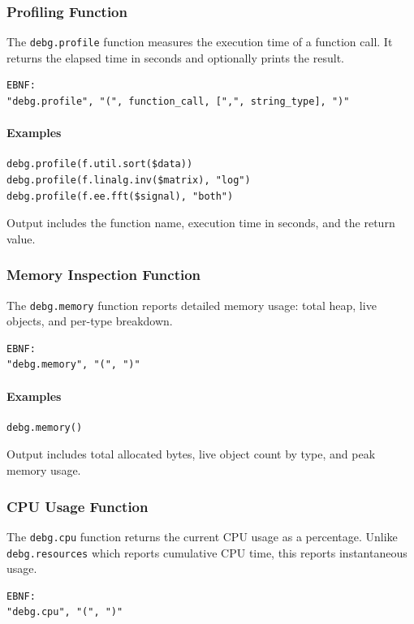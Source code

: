 \subsubsection{Profiling Function}
The \texttt{debg.profile} function measures the execution time of a function call. It returns the elapsed time in seconds and optionally prints the result.
\begin{verbatim}
EBNF:
"debg.profile", "(", function_call, [",", string_type], ")"
\end{verbatim}

\paragraph{Examples}
\begin{verbatim}
debg.profile(f.util.sort($data))
debg.profile(f.linalg.inv($matrix), "log")
debg.profile(f.ee.fft($signal), "both")
\end{verbatim}

Output includes the function name, execution time in seconds, and the return value.

\subsubsection{Memory Inspection Function}
The \texttt{debg.memory} function reports detailed memory usage: total heap, live objects, and per-type breakdown.
\begin{verbatim}
EBNF:
"debg.memory", "(", ")"
\end{verbatim}

\paragraph{Examples}
\begin{verbatim}
debg.memory()
\end{verbatim}

Output includes total allocated bytes, live object count by type, and peak memory usage.

\subsubsection{CPU Usage Function}
The \texttt{debg.cpu} function returns the current CPU usage as a percentage. Unlike \texttt{debg.resources} which reports cumulative CPU time, this reports instantaneous usage.
\begin{verbatim}
EBNF:
"debg.cpu", "(", ")"
\end{verbatim}

